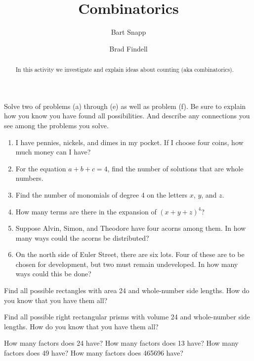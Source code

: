 \documentclass[nooutcomes,noauthor]{ximera}
\title{Combinatorics}
\author{Bart Snapp \and Brad Findell}
\begin{document}
\begin{abstract}
In this activity we investigate and explain ideas about counting (aka combinatorics).
\end{abstract}
\maketitle


\begin{problem}
Solve two of problems (a) through (e) as well as problem (f).  Be sure to explain how you know you have found all possibilities. And describe any connections you see among the problems you solve.
\begin{enumerate}
\item I have pennies, nickels, and dimes in my pocket.  If I choose four coins, how much money can I have?
\item For the equation $a + b + c = 4$, find the number of solutions that are whole numbers.
\item Find the number of monomials of degree 4 on the letters $x$, $y$, and $z$.  
\item How many terms are there in the expansion of $(x + y + z)^4$?
\item Suppose Alvin, Simon, and Theodore have four acorns among them.  In how many ways could the acorns be distributed?  
\item On the north side of Euler Street, there are six lots.  Four of these are to be chosen for development, but two must remain undeveloped.  In how many ways could this be done?
\end{enumerate}
\end{problem}

\begin{problem}
Find all possible rectangles with area 24 and whole-number side lengths.  How do you know that you have them all?
\end{problem}

\begin{problem}
Find all possible right rectangular prisms with volume 24 and whole-number side lengths.  How do you know that you have them all?  
\end{problem}

\begin{problem}
How many factors does 24 have?  How many factors does 13 have?  How many factors does 49 have?  How many factors does 465696 have?
\end{problem}
\end{document}

